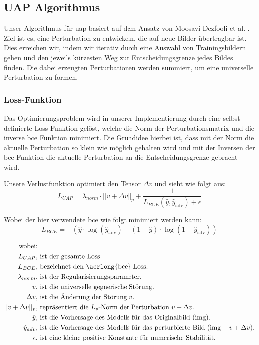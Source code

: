\subsection{UAP Algorithmus} \label{chap:UAP}

Unser Algorithmus für \acrfull{uap} basiert auf dem Ansatz von Moosavi-Dezfooli et al. \cite{moosavi-dezfooli_universal_2017}. Ziel ist es, eine Perturbation zu entwickeln, die auf neue Bilder übertragbar ist. Dies erreichen wir, indem wir iterativ durch eine Auswahl von Trainingsbildern gehen und den jeweils kürzesten Weg zur Entscheidungsgrenze jedes Bildes finden. Die dabei erzeugten Perturbationen werden summiert, um eine universelle Perturbation zu formen. 

\subsubsection{Loss-Funktion}
Das Optimierungsproblem wird in unserer Implementierung durch eine selbst definierte Loss-Funktion gelöst, welche die Norm der Perturbationsmatrix und die inverse \acrlong{bce} Funktion minimiert. Die Grundidee hierbei ist, dass mit der Norm die aktuelle Perturbation so klein wie möglich gehalten wird und mit der Inversen der \acrlong{bce} Funktion die aktuelle Perturbation an die Entscheidungsgrenze gebracht wird. 

Unsere Verlustfunktion optimiert den Tensor $\Delta v$ und sieht wie folgt aus:
\begin{equation}
    L_{UAP} = \lambda_{norm} \cdot ||v + \Delta v||_p + \frac{1}{L_{BCE}(\hat{y}, \hat{y}_{\text{adv}}) + \epsilon}
\label{Loss}
\end{equation}

Wobei der hier verwendete \acrlong{bce} wie folgt minimiert werden kann:
\begin{equation}
L_{BCE} = - (\hat{y} \cdot \log(\hat{y}_{\text{adv}}) + (1-\hat{y}) \cdot \log(1-\hat{y}_{\text{adv}}))
\label{eq:BCE}
\end{equation}

\begin{align*}
\text{wobei:}&\\
L_{UAP}, &\text{ ist der gesamte Loss.} \\
L_{BCE}, &\text{ bezeichnet den \acrlong{bce} Loss.} \\
\lambda_{norm}, &\text{ ist der Regularisierungsparameter.} \\
v, &\text{ ist die universelle gegnerische Störung.} \\
\Delta v, &\text{ ist die Änderung der Störung } v \text{.} \\
||v + \Delta v||_p, &\text{ repräsentiert die } L_p \text{-Norm der Perturbation } v + \Delta v. \\
\hat{y}, &\text{ ist die Vorhersage des Modells für das Originalbild ($\text{img}$).} \\
\hat{y}_{adv}, &\text{ ist die Vorhersage des Modells für das perturbierte Bild ($\text{img} + v + \Delta v$).} \\
\epsilon, &\text{ ist eine kleine positive Konstante für numerische Stabilität.}
\end{align*}

